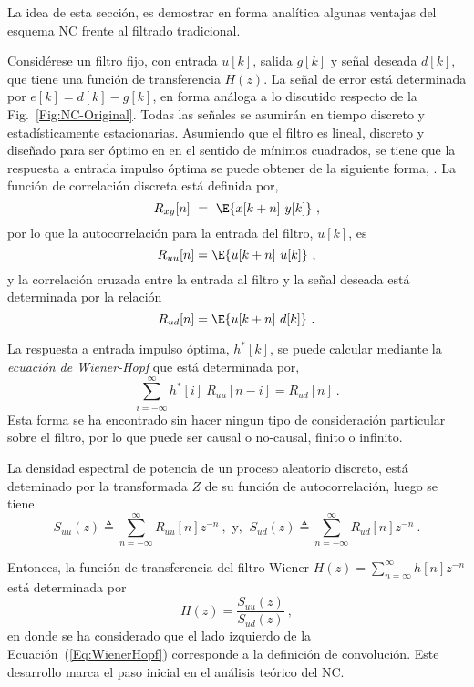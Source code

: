 La idea de esta sección, es demostrar en forma analítica algunas ventajas del esquema \ac{NC} frente al filtrado tradicional.

Considérese un filtro fijo, con entrada $u[k]$, salida $g[k]$ y señal deseada $d[k]$, que tiene una función de transferencia $H(z)$. La señal de error está determinada por $e[k] = d[k] - g[k]$, en forma análoga a lo discutido respecto de la Fig.~\ref{Fig:NC-Original}. Todas las señales se asumirán en tiempo discreto y estadísticamente estacionarias. Asumiendo que el filtro es lineal, discreto y diseñado para ser óptimo en en el sentido de mínimos cuadrados, se tiene que la respuesta a entrada impulso óptima se puede obtener de la siguiente forma, \cite{haykin,gustafsson,proakis-dsp}. La función de correlación discreta está definida por, \cite{proakis-dsp}
\begin{equation}
 R_{xy}[n] ~=~ \E{x[k+n]~y[k]}~,
\label{Eq:CrossCorrelation}
\end{equation}
por lo que la autocorrelación para la entrada del filtro, $u[k]$, es
$$R_{uu}[n] = \E{u[k+n]~u[k]}~ ,$$
y la correlación cruzada entre la entrada al filtro y la señal deseada está determinada por la relación
$$R_{ud}[n] = \E{u[k+n]~d[k]}~ .$$

La respuesta a entrada impulso óptima, $h^*[k]$, se puede calcular mediante la \textit{ecuación de Wiener-Hopf} que está determinada por, \cite{gustafsson}
\begin{equation}
 \sum_{i=-\infty}^{\infty} h^*[i]~R_{uu}[n-i] = R_{ud}[n]~.
\label{Eq:WienerHopf}
\end{equation}
Esta forma se ha encontrado sin hacer ningun tipo de consideración particular sobre el filtro, por lo que puede ser causal o no-causal, finito o infinito.

La densidad espectral de potencia de un proceso aleatorio discreto, está deteminado por la transformada $Z$ de su función de autocorrelación, luego se tiene
$$S_{uu}(z) \triangleq \sum_{n=-\infty}^{\infty} R_{uu}[n] z^{-n}~,
\mbox{ y,   }~ S_{ud}(z) \triangleq \sum_{n=-\infty}^{\infty} R_{ud}[n] z^{-n}~.$$

Entonces, la función de transferencia del filtro Wiener $H(z) = \sum_{n=\infty}^{\infty} h[n] z^{-n}$ está determinada por
\begin{equation}
 H(z) = \frac{S_{uu}(z)}{S_{ud}(z)}~,
\end{equation}
en donde se ha considerado que el lado izquierdo de la Ecuación~(\ref{Eq:WienerHopf}) corresponde a la definición de convolución. Este desarrollo marca el paso inicial en el análisis teórico del \ac{NC}.

